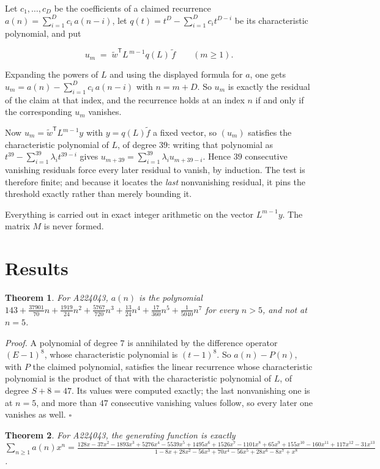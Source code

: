 \documentclass[11pt]{article}
\newtheorem{theorem}{Theorem}
\theoremstyle{definition}
\begin{document}
Let $c_1,\dots,c_D$ be the coefficients of a claimed recurrence $a(n) = \sum_{i=1}^{D} c_i\,a(n-i)$, let $q(t) = t^{D} - \sum_{i=1}^{D} c_i t^{D-i}$ be its characteristic polynomial, and put

\[u_m \;=\; \tilde w^{\mathsf T} L^{\,m-1} q(L)\,\tilde f \qquad (m \ge 1).\]

Expanding the powers of $L$ and using the displayed formula for $a$, one gets $u_m = a(n) - \sum_{i=1}^{D} c_i\,a(n-i)$ with $n = m + D$. So $u_m$ is exactly the residual of the claim at that index, and the recurrence holds at an index $n$ if and only if the corresponding $u_m$ vanishes.

Now $u_m = \tilde w^{\mathsf T} L^{m-1} y$ with $y = q(L)\tilde f$ a fixed vector, so $(u_m)$ satisfies the characteristic polynomial of $L$, of degree $39$: writing that polynomial as $t^{39} - \sum_{i=1}^{39} \lambda_i t^{39-i}$ gives $u_{m+39} = \sum_{i=1}^{39} \lambda_i u_{m+39-i}$. Hence $39$ consecutive vanishing residuals force every later residual to vanish, by induction. The test is therefore finite; and because it locates the {\itshape last} nonvanishing residual, it pins the threshold exactly rather than merely bounding it.

Everything is carried out in exact integer arithmetic on the vector $L^{m-1}y$. The matrix $M$ is never formed.

\section{Results}

\begin{theorem} For A224043, $a(n)$ is the polynomial $143 + \frac{37901}{70}n + \frac{1919}{24}n^{2} + \frac{5767}{720}n^{3} + \frac{13}{24}n^{4} + \frac{17}{360}n^{5} + \frac{1}{5040}n^{7}$ for every $n > 5$, and not at $n = 5$.\end{theorem}

{\itshape Proof.} A polynomial of degree $7$ is annihilated by the difference operator $(E-1)^{8}$, whose characteristic polynomial is $(t-1)^{8}$. So $a(n) - P(n)$, with $P$ the claimed polynomial, satisfies the linear recurrence whose characteristic polynomial is the product of that with the characteristic polynomial of $L$, of degree $S + 8 = 47$. Its values were computed exactly; the last nonvanishing one is at $n = 5$, and more than $47$ consecutive vanishing values follow, so every later one vanishes as well. $\square$

\begin{theorem} For A224043, the generating function is exactly $\sum_{n\ge 1} a(n)x^n = \frac{128x - 37x^{2} - 1893x^{3} + 5276x^{4} - 5539x^{5} + 1495x^{6} + 1526x^{7} - 1101x^{8} + 65x^{9} + 155x^{10} - 160x^{11} + 117x^{12} - 31x^{13}}{1 - 8x + 28x^{2} - 56x^{3} + 70x^{4} - 56x^{5} + 28x^{6} - 8x^{7} + x^{8}}$.\end{theorem}
\end{document}
